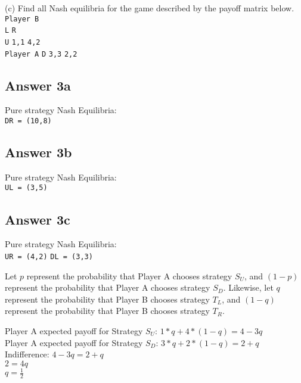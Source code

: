 \documentclass[twoside]{article}
\begin{document}
(c) Find all Nash equilibria for the game described by the payoff matrix below.\\

\hspace*{40mm}\texttt{Player B }\\
\hspace*{40mm}\texttt{L} \hspace*{15mm}\texttt{R}\\
\hspace*{24mm}\texttt{U} \hspace{12mm}\texttt{1,1} \hspace{12mm}\texttt{4,2}\\
\texttt{Player A} \hspace*{8mm}\texttt{D} \hspace{12mm}\texttt{3,3} \hspace{12mm}\texttt{2,2}\\

\subsection{Answer 3a}

Pure strategy Nash Equilibria: \\
\texttt{DR = (10,8)}

\subsection{Answer 3b}

Pure strategy Nash Equilibria: \\
\texttt{UL = (3,5)}

\subsection{Answer 3c}

Pure strategy Nash Equilibria: \\
\texttt{UR = (4,2)}
\texttt{DL = (3,3)}

Let $p$ represent the probability that Player A chooses strategy $S_{U}$, and $(1-p)$ represent the probability that Player A chooses strategy $S_{D}$. Likewise, let $q$ represent the probability that Player B chooses strategy $T_{L}$, and $(1-q)$ represent the probability that Player B chooses strategy $T_{R}$.

Player A expected payoff for Strategy $S_{U}$: $1*q + 4*(1-q) = 4 - 3q$ \\
Player A expected payoff for Strategy $S_{D}$: $3*q + 2*(1-q) = 2 + q$ \\
Indifference: 
$4 - 3q = 2 + q$ \\
$2 = 4q$ \\
$q = \frac{1}{2}$ \\
\end{document}
